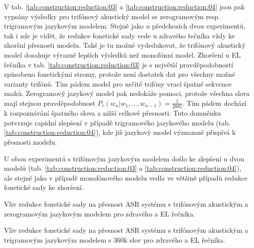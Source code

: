 V tab. \ref{tab:construction:reduction:03} a \ref{tab:construction:reduction:04} jsou pak vypsány výsledky pro trifónový akustický model se zerogramovým resp. trigramovým jazykovým modelem. Stejně jako u předchozích dvou experimentů, tak i zde je vidět, že redukce fonetické sady vede u zdravého řečníka vždy ke zhoršní přesnosti modelu. Také je tu možné vydedukovat, že trifónový akustický model dosahuje výrazně lepších výsledků než monofónní model. Zhoršení u EL řečníka v tab. \ref{tab:construction:reduction:03} je s největší pravděpodobností způsobeno fonetickými stromy, protože není dostatek dat pro všechny možné varianty trifónů. Tím pádem model pro určité trifóny vrací špatné sekvence znaků. Zerogramový jazykový model pak nedokáže pomoci, protože všechna slova mají stejnou pravděpodobnost $P_r(w_n|w_1,\dots,w_{n-1}) = \frac{1}{2885}$. Tím pádem dochází k rozpoznávání špatného slova a nižší celkové přesnosti. Tuto domněnku potvrzuje rapidní zlepšení v případě trigramového jazykového modelu (tab. \ref{tab:construction:reduction:04}), kde již jazykový model významně přispívá k přesnosti modelu.

U obou experimentů s trifónovým jazykovým modelem došlo ke zlepšení u dvou modelů (tab. \ref{tab:construction:reduction:03} a \ref{tab:construction:reduction:04}), ale stejně jako v případě monofónového modelu vedla ve většině případů redukce fonetické sady ke zhoršení.

\begin{table}[htpb]
  \centering
  \def\arraystretch{1.5}
  \caption{Vliv redukce fonetické sady na přesnost ASR systému s trifónovým akustickým a zerogramovým jazykovým modelem pro zdravého a EL řečníka.}
  \label{tab:construction:reduction:03}
\end{table}

\begin{table}[htpb]
  \centering
  \def\arraystretch{1.5}
  \caption{Vliv redukce fonetické sady na přesnost ASR systému s trifónovým akustickým a trigramovým jazykovým modelem s 360k slov pro zdravého a EL řečníka.}
  \label{tab:construction:reduction:04}
\end{table}

